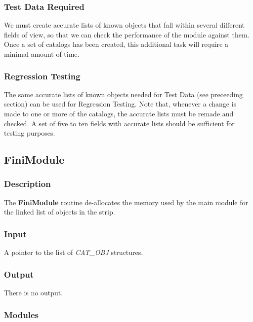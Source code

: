 \subsubsection {Test Data Required}

  We must create accurate lists of known objects that fall within
several different fields of view, so that we can check the performance
of the \kom module against them.  Once a set of catalogs has been
created, this additional task will require a minimal amount of time.

\subsubsection {Regression Testing}

  The same accurate lists of known objects needed for Test Data
(see preceeding section) can be used for Regression Testing. 
Note that, whenever a change is made to one or more of the
catalogs, the accurate lists must be remade and checked.
A set of five to ten fields with accurate lists should be
sufficient for testing purposes.

\subsection {FiniModule}

\subsubsection {Description}

  The {\bf FiniModule} routine de-allocates the memory used by
the main module for the linked list of objects in the strip.

\subsubsection {Input}

  A pointer to the list of {\it CAT\_OBJ} structures.

\subsubsection {Output}

  There is no output.

\subsubsection {Modules}

